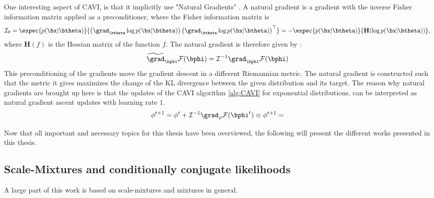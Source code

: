 One interesting aspect of \ac{CAVI}, is that it implicitly use "Natural Gradients" \cite{amariNaturalGradientWorks1998}.
A natural gradient is a gradient with the inverse Fisher information matrix applied as a preconditioner, where the Fisher information matrix is
\begin{align}
    \mathcal{I}_\theta = \expec{p(\bx|\btheta)}{\left(\grad_{\btheta}\log p(\bx|\btheta)\right)\left(\grad_{\btheta} \log p(\bx|\btheta)\right)^\top} = -\expec{p(\bx|\btheta)}{\mathbf{H}(\log p(\bx|\btheta))},
    \label{eq:fisherinfomatrix}
\end{align}
where $\mathbf{H}(f)$ is the Hessian matrix of the function $f$.
The natural gradient is therefore given by :
\begin{align*}
    \widetilde{\grad}_{\bphi}\mathcal{F}(\bphi) = \mathcal{I}^{-1} \grad_{\bphi}\mathcal{F}(\bphi)
\end{align*}
This preconditioning of the gradients move the gradient descent in a different Riemannian metric.
The natural gradient is constructed such that the metric it gives maximizes the change of the \ac{KL} divergence between the given distribution and its target.
The reason why natural gradients are brought up here is that the updates of the \ac{CAVI} algorithm \ref{alg:CAVI} for exponential distributions, can be interpreted as natural gradient ascent updates with learning rate $1$.
\begin{align*}
    \phi^{t+1} = \phi^t + \mathcal{I}^{-1}\grad_{\phi}\mathcal{F}(\bphi^t) \equiv \phi^{t+1} = 
\end{align*}

Now that all important and necessary topics for this thesis have been overviewed, the following will present the different works presented in this thesis. 

\subsection{Scale-Mixtures and conditionally conjugate likelihoods}

A large part of this work is based on scale-mixtures and mixtures in general.



